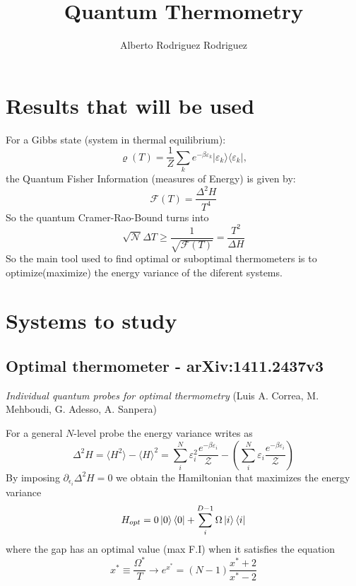 \documentclass{article}
\title{\textbf{Quantum Thermometry}}
\author{Alberto Rodriguez Rodriguez}
\begin{document}
\maketitle
\section{Results that will be used}
For a Gibbs state (system in thermal equilibrium):
\begin{equation}\label{Gibbs operator}
{\varrho}(T) = \frac{1}{Z} \sum_k e^{-\beta \varepsilon_k} |\varepsilon_k\rangle\langle\varepsilon_k|,
\end{equation}
the Quantum Fisher Information (measures of Energy) is given by:
\begin{equation}
    \mathcal{F}(T)=\frac{\Delta^2 H}{T^4}
\end{equation}
So the quantum Cramer-Rao-Bound turns into
\begin{equation}
    \sqrt{\mathcal{N}}\Delta T\geq \frac{1}{\sqrt{\mathcal{F}(T)}}=\frac{T^2}{\Delta H}
\end{equation}
So the main tool used to find optimal or suboptimal thermometers is to optimize(maximize) the energy variance of the diferent systems.
\section{Systems to study}
\subsection{Optimal thermometer - arXiv:1411.2437v3}
\small{\textit{Individual quantum probes for optimal thermometry} (Luis A. Correa, M. Mehboudi, G. Adesso, A. Sanpera)}

\vspace{0.7 cm}
For a general $N$-level probe the energy variance writes as
\begin{equation}\label{Energy Variance}
    \Delta^2 H=\langle H^2\rangle - \langle H \rangle^2=\sum_i^N\varepsilon_i^2 \frac{e^{-\beta\varepsilon_i}}{\mathcal{Z}}-\left(\sum_i^N\varepsilon_i\frac{e^{-\beta\varepsilon_i}}{\mathcal{Z}}\right)
\end{equation}
By imposing $\partial_{\epsilon_i}\Delta^2 H=0$ we obtain the Hamiltonian that maximizes the energy variance
\begin{equation}
    H_{opt} = 0\ket{0}\bra{0} +\sum_i^{D-1}\Omega\ket{i}\bra{i}
    \label{Hopt}
\end{equation}
where the gap has an optimal value (max F.I) when it satisfies the equation
\begin{equation}
    x^*\equiv\frac{\Omega^*}{T}\xrightarrow{}e^{x^*}=(N-1)\frac{x^*+2}{x^*-2}
\end{equation}
\end{document}
